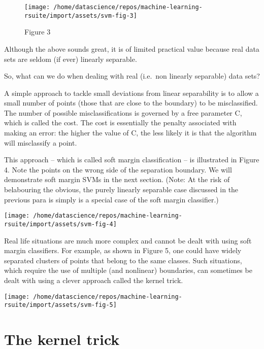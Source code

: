 \documentclass[]{book}
\begin{document}
\begin{figure}

{\centering \texttt{[image: /home/datascience/repos/machine-learning-rsuite/import/assets/svm-fig-3]} 

}

\caption{Figure 3}\label{fig:unnamed-chunk-5}
\end{figure}

Although the above sounds great, it is of limited practical value because real data sets are seldom (if ever) linearly separable.

So, what can we do when dealing with real (i.e.~non linearly separable) data sets?

A simple approach to tackle small deviations from linear separability is to allow a small number of points (those that are close to the boundary) to be misclassified. The number of possible misclassifications is governed by a free parameter C, which is called the cost. The cost is essentially the penalty associated with making an error: the higher the value of C, the less likely it is that the algorithm will misclassify a point.

This approach -- which is called soft margin classification -- is illustrated in Figure 4. Note the points on the wrong side of the separation boundary. We will demonstrate soft margin SVMs in the next section. (Note: At the risk of belabouring the obvious, the purely linearly separable case discussed in the previous para is simply is a special case of the soft margin classifier.)

\begin{center}\texttt{[image: /home/datascience/repos/machine-learning-rsuite/import/assets/svm-fig-4]} \end{center}

Real life situations are much more complex and cannot be dealt with using soft margin classifiers. For example, as shown in Figure 5, one could have widely separated clusters of points that belong to the same classes. Such situations, which require the use of multiple (and nonlinear) boundaries, can sometimes be dealt with using a clever approach called the kernel trick.

\begin{center}\texttt{[image: /home/datascience/repos/machine-learning-rsuite/import/assets/svm-fig-5]} \end{center}

\hypertarget{the-kernel-trick}{%
\section{The kernel trick}\label{the-kernel-trick}}
\end{document}
